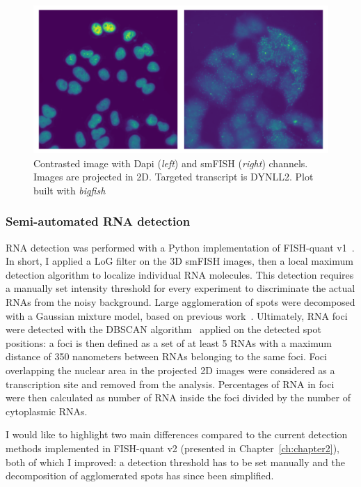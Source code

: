\begin{figure}[]
    \centering
    \includegraphics[width=\textwidth]{figures/chapter5/FoV_DYNLL2}
    \caption[Contrasted image with Dapi and smFISH channels]{Contrasted image with Dapi (\textit{left}) and smFISH (\textit{right}) channels.
	Images are projected in 2D.
	Targeted transcript is DYNLL2.
	Plot built with \emph{bigfish}}
    \label{fig:fov_racha}
\end{figure}

\subsubsection{Semi-automated RNA detection}

\ac{RNA} detection was performed with a Python implementation of FISH-quant v1~\cite{mueller_fish-quant_2013}.
In short, I applied a \ac{LoG} filter on the 3D \ac{smFISH} images, then a local maximum detection algorithm to localize individual RNA molecules.
This detection requires a manually set intensity threshold for every experiment to discriminate the actual RNAs from the noisy background.
Large agglomeration of spots were decomposed with a Gaussian mixture model, based on previous work~\cite{samacoits_computational_2018}.
Ultimately, \ac{RNA} foci were detected with the DBSCAN algorithm~\cite{ester_density-based_1996} applied on the detected spot positions: a foci is then defined as a set of at least 5 RNAs  with a maximum distance of 350 nanometers between RNAs belonging to the same foci.
Foci overlapping the nuclear area in the projected 2D images were considered as a transcription site and removed from the analysis.
Percentages of \ac{RNA} in foci were then calculated as number of \ac{RNA} inside the foci divided by the number of cytoplasmic \ac{RNA}s.

I would like to highlight two main differences compared to the current detection methods implemented in FISH-quant v2 (presented in Chapter~\ref{ch:chapter2}), both of which I improved: a detection threshold has to be set manually and the decomposition of agglomerated spots has since been simplified.

